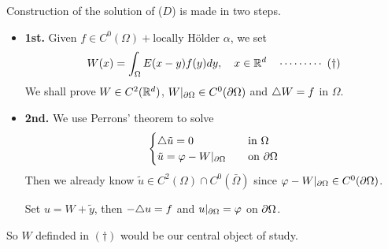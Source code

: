 \documentclass[12pt,a4paper]{article}
\renewenvironment{i}
{\begin{itemize} 
	}%
	{\end{itemize}
}
\begin{document}
Construction of the solution of ($D$) is made in two steps.
\begin{i}
\item[\textbf{1st.}] Given $f\in C^0(\Omega) + \text{locally H\"older } \alpha$, we set
\begin{align*}
W(x) = \int_{\Omega} E(x-y) f(y) dy, \quad x\in \mathbb{R}^d \quad \cdots\cdots\cdots\,\,(\dagger)
\end{align*}
We shall prove $W\in C^2(\mathbb{R}^d)$, $W|_{\partial \Omega} \in C^0(\partial \Omega)$ and $\triangle W=f$ in $\Omega$.

\item[\textbf{2nd.}] We use Perrons' theorem to solve
\begin{align*}
\begin{cases}
\triangle \tilde u =0\quad &\text{in } \Omega\\
\tilde u = \varphi - W|_{\partial \Omega}\quad &\text{on } \partial \Omega
\end{cases}
\end{align*}
Then we already know $\tilde u\in C^2(\Omega) \cap C^0(\bar{\Omega})$ since $\varphi - W|_{\partial \Omega} \in C^0(\partial \Omega)$.

\quad Set $u = W+ \tilde{y}$, then $-\triangle u =f$ and $u|_{\partial \Omega} = \varphi$ on $\partial \Omega$.
\end{i}
\s

So $W$ definded in $(\dagger)$ would be our central object of study.
\s
\end{document}
